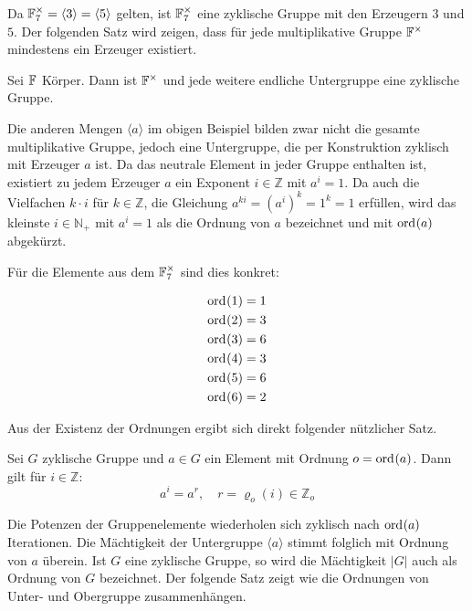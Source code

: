 Da $\field{7}^\times = \langle 3 \rangle = \langle 5 \rangle$ gelten, ist $\field{7}^\times$ eine zyklische Gruppe mit den Erzeugern $3$ und $5$. Der folgenden Satz wird zeigen, dass für jede multiplikative Gruppe $\field{}^\times$ mindestens ein Erzeuger existiert.

\begin{satz}
    Sei $\field{}$ Körper. Dann ist $\field{}^\times$ und jede weitere endliche Untergruppe eine zyklische Gruppe. 
\end{satz}

Die anderen Mengen $\langle a \rangle$ im obigen Beispiel bilden zwar nicht die gesamte multiplikative Gruppe, jedoch eine Untergruppe, die per Konstruktion zyklisch mit Erzeuger $a$ ist. Da das neutrale Element in jeder Gruppe enthalten ist, existiert zu jedem Erzeuger $a$ ein Exponent $i \in \mathbb{Z}$ mit $a^i = 1$. Da auch die Vielfachen $k\cdot i$ für $k\in \mathbb{Z}$, die Gleichung $a^{ki} = {(a^i)}^k = 1^k = 1$ erfüllen, wird das kleinste $i \in \mathbb{N}_+$ mit $a^i = 1$ als die Ordnung von $a$ bezeichnet und mit $\ord{a}$ abgekürzt.

Für die Elemente aus dem $\field{7}^\times$ sind dies konkret:

\begin{align*}
    \ord{1} &= 1 \\
    \ord{2} &= 3 \\
    \ord{3} &= 6 \\
    \ord{4} &= 3 \\
    \ord{5} &= 6 \\
    \ord{6} &= 2
\end{align*}

Aus der Existenz der Ordnungen ergibt sich direkt folgender nützlicher Satz.

\begin{satz} \label{satz:cyclicity}
    Sei $G$ zyklische Gruppe und $a \in G$ ein Element mit Ordnung $o = \ord{a}$. Dann gilt für $i \in \mathbb{Z}$:
    \begin{equation*}
        a^i = a^r, \quad r = \varrho_o(i) \in \mathbb{Z}_o
    \end{equation*}
\end{satz}

Die Potenzen der Gruppenelemente wiederholen sich zyklisch nach $\ord{a}$ Iterationen. Die Mächtigkeit der Untergruppe $\langle a \rangle$ stimmt folglich mit Ordnung von $a$ überein. Ist $G$ eine zyklische Gruppe, so wird die Mächtigkeit $|G|$ auch als Ordnung von $G$ bezeichnet.
Der folgende Satz zeigt wie die Ordnungen von Unter- und Obergruppe zusammenhängen.

